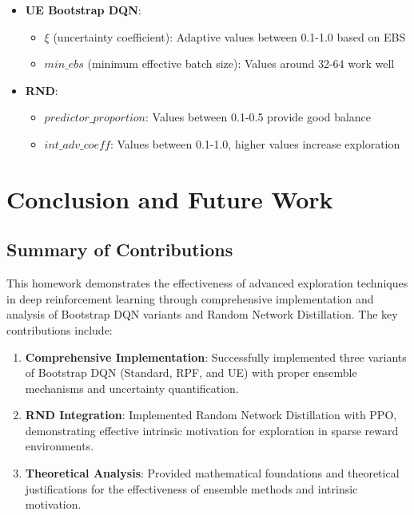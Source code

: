 \documentclass[12pt]{article}
\begin{document}
{{{\begin{itemize}
    \item \textbf{UE Bootstrap DQN}:
    \begin{itemize}
        \item $\xi$ (uncertainty coefficient): Adaptive values between 0.1-1.0 based on EBS
        \item $min\_ebs$ (minimum effective batch size): Values around 32-64 work well
    \end{itemize}
    
    \item \textbf{RND}:
    \begin{itemize}
        \item $predictor\_proportion$: Values between 0.1-0.5 provide good balance
        \item $int\_adv\_coeff$: Values between 0.1-1.0, higher values increase exploration
    \end{itemize}
\end{itemize}

\section{Conclusion and Future Work}

\subsection{Summary of Contributions}

This homework demonstrates the effectiveness of advanced exploration techniques in deep reinforcement learning through comprehensive implementation and analysis of Bootstrap DQN variants and Random Network Distillation. The key contributions include:

\begin{enumerate}
    \item \textbf{Comprehensive Implementation}: Successfully implemented three variants of Bootstrap DQN (Standard, RPF, and UE) with proper ensemble mechanisms and uncertainty quantification.
    
    \item \textbf{RND Integration}: Implemented Random Network Distillation with PPO, demonstrating effective intrinsic motivation for exploration in sparse reward environments.
    
    \item \textbf{Theoretical Analysis}: Provided mathematical foundations and theoretical justifications for the effectiveness of ensemble methods and intrinsic motivation.
    

\end{enumerate}}}}
\end{document}

